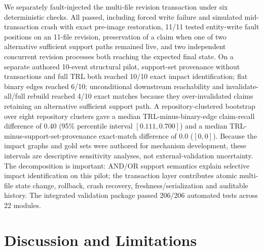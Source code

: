 \documentclass[cmc,article,submit,moreauthors,pdftex]{Definitions/tsp}
\begin{document}
We separately fault-injected the multi-file revision transaction under six deterministic checks. All passed, including forced write failure and simulated mid-transaction crash with exact pre-image restoration, 11/11 tested entity-write fault positions on an 11-file revision, preservation of a claim when one of two alternative sufficient support paths remained live, and two independent concurrent revision processes both reaching the expected final state. On a separate authored 10-event structural pilot, support-set provenance without transactions and full TRL both reached 10/10 exact impact identification; flat binary edges reached 6/10; unconditional downstream reachability and invalidate-all/full rebuild reached 4/10 exact matches because they over-invalidated claims retaining an alternative sufficient support path. A repository-clustered bootstrap over eight repository clusters gave a median TRL-minus-binary-edge claim-recall difference of 0.40 (95\% percentile interval $[0.111,0.700]$) and a median TRL-minus-support-set-provenance exact-match difference of 0.0 ($[0,0]$). Because the impact graphs and gold sets were authored for mechanism development, these intervals are descriptive sensitivity analyses, not external-validation uncertainty. The decomposition is important: AND/OR support semantics explain selective impact identification on this pilot; the transaction layer contributes atomic multi-file state change, rollback, crash recovery, freshness/serialization and auditable history. The integrated validation package passed 206/206 automated tests across 22 modules.

\section{Discussion and Limitations}
\label{sec:discussion}
\end{document}
